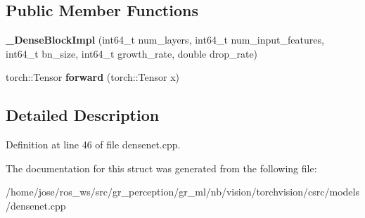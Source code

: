 \subsection*{Public Member Functions}
\begin{DoxyCompactItemize}
\item 
\mbox{\label{structvision_1_1models_1_1__DenseBlockImpl_aaf609b5647834260f4b93da3bfbd387f}} 
{\bfseries \+\_\+\+Dense\+Block\+Impl} (int64\+\_\+t num\+\_\+layers, int64\+\_\+t num\+\_\+input\+\_\+features, int64\+\_\+t bn\+\_\+size, int64\+\_\+t growth\+\_\+rate, double drop\+\_\+rate)
\item 
\mbox{\label{structvision_1_1models_1_1__DenseBlockImpl_a428f13647e411291d3f2c97b791dfe86}} 
torch\+::\+Tensor {\bfseries forward} (torch\+::\+Tensor x)
\end{DoxyCompactItemize}


\subsection{Detailed Description}


Definition at line 46 of file densenet.\+cpp.



The documentation for this struct was generated from the following file\+:\begin{DoxyCompactItemize}
\item 
/home/jose/ros\+\_\+ws/src/gr\+\_\+perception/gr\+\_\+ml/nb/vision/torchvision/csrc/models/densenet.\+cpp\end{DoxyCompactItemize}
